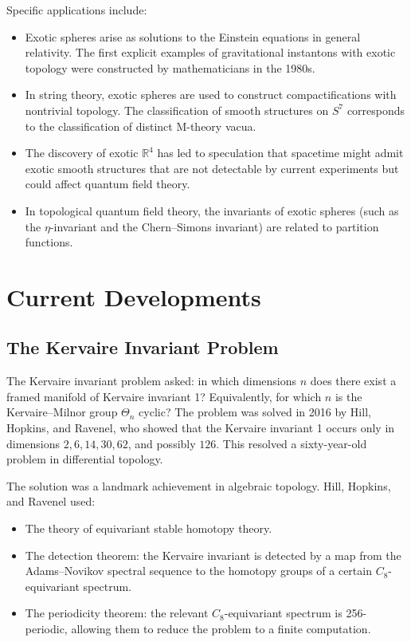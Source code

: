 Specific applications include:
\begin{itemize}
\item Exotic spheres arise as solutions to the Einstein equations in general relativity. The first explicit examples of gravitational instantons with exotic topology were constructed by mathematicians in the 1980s.
\item In string theory, exotic spheres are used to construct compactifications with nontrivial topology. The classification of smooth structures on $S^7$ corresponds to the classification of distinct M-theory vacua.
\item The discovery of exotic $\mathbb{R}^4$ has led to speculation that spacetime might admit exotic smooth structures that are not detectable by current experiments but could affect quantum field theory.
\item In topological quantum field theory, the invariants of exotic spheres (such as the $\eta$-invariant and the Chern--Simons invariant) are related to partition functions.
\end{itemize}

\section{Current Developments}

\subsection{The Kervaire Invariant Problem}

The Kervaire invariant problem asked: in which dimensions $n$ does there exist a framed manifold of Kervaire invariant 1? Equivalently, for which $n$ is the Kervaire--Milnor group $\Theta_n$ cyclic? The problem was solved in 2016 by Hill, Hopkins, and Ravenel, who showed that the Kervaire invariant 1 occurs only in dimensions $2, 6, 14, 30, 62$, and possibly $126$. This resolved a sixty-year-old problem in differential topology.

The solution was a landmark achievement in algebraic topology. Hill, Hopkins, and Ravenel used:
\begin{itemize}
\item The theory of equivariant stable homotopy theory.
\item The detection theorem: the Kervaire invariant is detected by a map from the Adams--Novikov spectral sequence to the homotopy groups of a certain $C_8$-equivariant spectrum.
\item The periodicity theorem: the relevant $C_8$-equivariant spectrum is 256-periodic, allowing them to reduce the problem to a finite computation.
\end{itemize}

